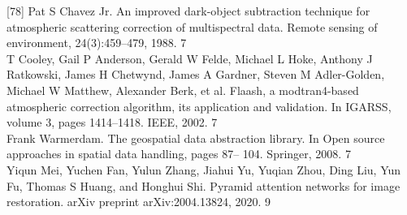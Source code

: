 \documentclass{article}
\begin{document}
[78] Pat S Chavez Jr. An improved dark-object subtraction technique for atmospheric scattering correction of multispectral data. Remote sensing of environment, 24(3):459–479, 1988. 7\\
[79] T Cooley, Gail P Anderson, Gerald W Felde, Michael L Hoke, Anthony J Ratkowski, James H Chetwynd, James A Gardner, Steven M Adler-Golden, Michael W Matthew, Alexander Berk, et al. Flaash, a modtran4-based atmospheric correction algorithm, its application and validation. In IGARSS, volume 3, pages 1414–1418. IEEE, 2002. 7\\
[80] Frank Warmerdam. The geospatial data abstraction library. In Open source approaches in spatial data handling, pages 87– 104. Springer, 2008. 7\\
[81] Yiqun Mei, Yuchen Fan, Yulun Zhang, Jiahui Yu, Yuqian Zhou, Ding Liu, Yun Fu, Thomas S Huang, and Honghui Shi. Pyramid attention networks for image restoration. arXiv preprint arXiv:2004.13824, 2020. 9
\end{document}
